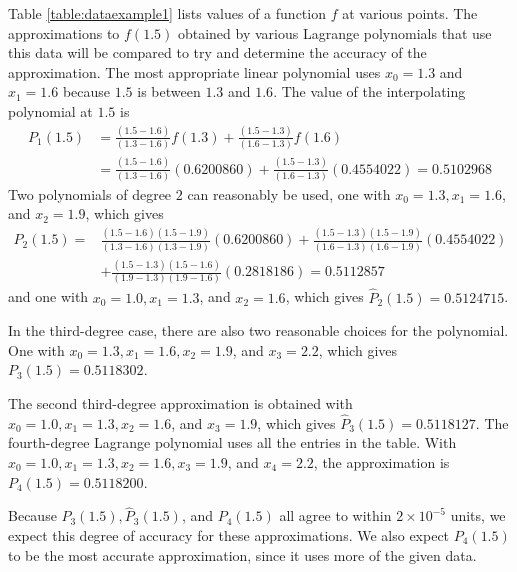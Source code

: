 \begin{example}
Table \ref{table:dataexample1} lists values of a function $f$ at various points. The approximations to $f(1.5)$ obtained by various Lagrange polynomials that use this data will be compared to try and determine the accuracy of the approximation. The most appropriate linear polynomial uses $x_{0}=1.3$ and $x_{1}=1.6$ because $1.5$ is between $1.3$ and $1.6$. The value of the interpolating polynomial at $1.5$ is
\[\begin{aligned}
P_{1}(1.5) & =\frac{(1.5-1.6)}{(1.3-1.6)} f(1.3)+\frac{(1.5-1.3)}{(1.6-1.3)} f(1.6) \\
& =\frac{(1.5-1.6)}{(1.3-1.6)}(0.6200860)+\frac{(1.5-1.3)}{(1.6-1.3)}(0.4554022)=0.5102968
\end{aligned}\]
Two polynomials of degree $2$ can reasonably be used, one with $x_{0}=1.3, x_{1}=1.6$, and $x_{2}=1.9$, which gives
\[\begin{aligned}
P_{2}(1.5)= & \frac{(1.5-1.6)(1.5-1.9)}{(1.3-1.6)(1.3-1.9)}(0.6200860)+\frac{(1.5-1.3)(1.5-1.9)}{(1.6-1.3)(1.6-1.9)}(0.4554022) \\
& +\frac{(1.5-1.3)(1.5-1.6)}{(1.9-1.3)(1.9-1.6)}(0.2818186)=0.5112857
\end{aligned}\]
and one with $x_{0}=1.0, x_{1}=1.3$, and $x_{2}=1.6$, which gives $\hat{P}_{2}(1.5)=0.5124715$.

In the third-degree case, there are also two reasonable choices for the polynomial. One with $x_{0}=1.3, x_{1}=1.6, x_{2}=1.9$, and $x_{3}=2.2$, which gives $P_{3}(1.5)=0.5118302$.

The second third-degree approximation is obtained with $x_{0}=1.0, x_{1}=1.3, x_{2}=1.6$, and $x_{3}=1.9$, which gives $\hat{P}_{3}(1.5)=0.5118127$. The fourth-degree Lagrange polynomial uses all the entries in the table. With $x_{0}=1.0, x_{1}=1.3, x_{2}=1.6, x_{3}=1.9$, and $x_{4}=2.2$, the approximation is $P_{4}(1.5)=0.5118200$.

Because $P_{3}(1.5), \hat{P}_{3}(1.5)$, and $P_{4}(1.5)$ all agree to within $2 \times 10^{-5}$ units, we expect this degree of accuracy for these approximations. We also expect $P_{4}(1.5)$ to be the most accurate approximation, since it uses more of the given data.


\end{example}
